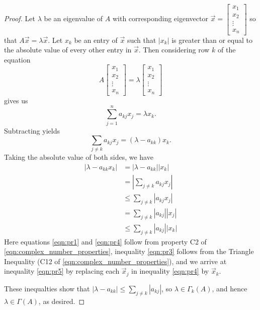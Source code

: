 \documentclass{ximera}
\begin{document}
\begin{proof}
Let $\lambda$ be an eigenvalue of $A$ with corresponding eigenvector $\vec{x}=\begin{bmatrix}
x_1 \\ x_2 \\ \vdots \\ x_n
\end{bmatrix}$ so that $A\vec{x}=\lambda\vec{x}$. Let $x_k$ be an entry of $\vec{x}$ such that $|x_k|$ is greater than or equal to the absolute value of every other entry in $\vec{x}$.  Then considering row $k$ of the equation $$A\begin{bmatrix}
x_1 \\ x_2 \\ \vdots \\ x_n
\end{bmatrix}=\lambda\begin{bmatrix}
x_1 \\ x_2 \\ \vdots \\ x_n
\end{bmatrix}$$ gives us 
$$\sum_{j=1}^n a_{kj} x_j = \lambda x_k.$$
Subtracting yields 
$$\sum_{j\ne k} a_{kj} x_j = (\lambda - a_{kk}) x_k.$$
Taking the absolute value of both sides, we have
\begin{align}
    |\lambda - a_{kk} x_k| &= |\lambda - a_{kk}| |x_k|\label{eqn:pr1} \\ 
    &= \left|\sum_{j\ne k} a_{kj} x_j\right| \label{eqn:pr2} \\ 
    &\le \sum_{j\ne k} |a_{kj} x_j| \label{eqn:pr3} \\ 
    &= \sum_{j\ne k} |a_{kj}| |x_j| \label{eqn:pr4}\\ 
    &\le \sum_{j\ne k} |a_{kj}| |x_k| \label{eqn:pr5}
\end{align}
Here equations \ref{eqn:pr1} and \ref{eqn:pr4} follow from property C2 of \ref{eqn:complex_number_properties}, inequality \ref{eqn:pr3} follows from the Triangle Inequality (C12 of \ref{eqn:complex_number_properties}), and we arrive at inequality \ref{eqn:pr5} by replacing each $\vec{x}_j$ in inequality \ref{eqn:pr4} by $\vec{x}_k$.

These inequalties show that $|\lambda - a_{kk}| \le \sum_{j\ne k} |a_{kj}|$, so $\lambda \in \Gamma_k(A)$, and hence $\lambda \in \Gamma(A)$, as desired.

\end{proof}
\end{document}
